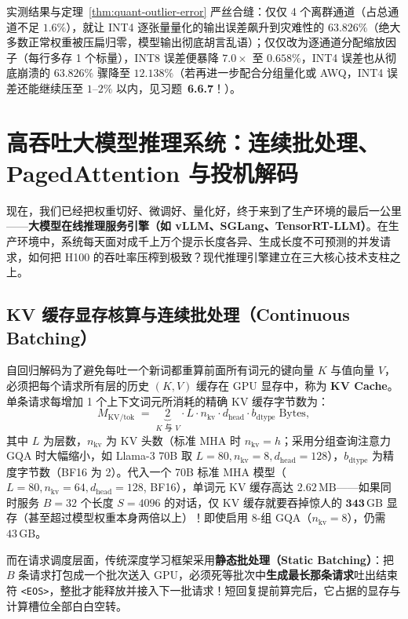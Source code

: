 实测结果与定理~\ref{thm:quant-outlier-error} 严丝合缝：仅仅 4 个离群通道（占总通道不足 $1.6\%$），就让 INT4 逐张量量化的输出误差飙升到灾难性的 $\mathbf{63.826\%}$（绝大多数正常权重被压扁归零，模型输出彻底胡言乱语）；仅仅改为逐通道分配缩放因子（每行多存 1 个标量），INT8 误差便暴降 $7.0\times$ 至 $\mathbf{0.658\%}$，INT4 误差也从彻底崩溃的 $63.826\%$ 骤降至 $\mathbf{12.138\%}$（若再进一步配合分组量化或 AWQ，INT4 误差还能继续压至 $1\text{--}2\%$ 以内，见习题~\textbf{6.6.7}！）。

\section{高吞吐大模型推理系统：连续批处理、PagedAttention 与投机解码}
\label{sec:llm-serving}

现在，我们已经把权重切好、微调好、量化好，终于来到了生产环境的最后一公里——\textbf{大模型在线推理服务引擎（如 vLLM、SGLang、TensorRT-LLM）}。在生产环境中，系统每天面对成千上万个提示长度各异、生成长度不可预测的并发请求，如何把 H100 的吞吐率压榨到极致？现代推理引擎建立在三大核心技术支柱之上。

\subsection{KV 缓存显存核算与连续批处理（Continuous Batching）}

自回归解码为了避免每吐一个新词都重算前面所有词元的键向量 $K$ 与值向量 $V$，必须把每个请求所有层的历史 $(K, V)$ 缓存在 GPU 显存中，称为 \textbf{KV Cache}。单条请求每增加 1 个上下文词元所消耗的精确 KV 缓存字节数为：
\begin{equation}
  M_{\mathrm{KV/tok}} \;=\; \underbrace{2}_{K\text{ 与 }V} \cdot L \cdot n_{\mathrm{kv}} \cdot d_{\mathrm{head}} \cdot b_{\mathrm{dtype}}\;\text{Bytes},
  \label{eq:kv-cache-formula}
\end{equation}
其中 $L$ 为层数，$n_{\mathrm{kv}}$ 为 KV 头数（标准 MHA 时 $n_{\mathrm{kv}} = h$；采用分组查询注意力 GQA 时大幅缩小，如 Llama-3 70B 取 $L = 80, n_{\mathrm{kv}} = 8, d_{\mathrm{head}} = 128$），$b_{\mathrm{dtype}}$ 为精度字节数（BF16 为 2）。代入一个 70B 标准 MHA 模型（$L=80, n_{\mathrm{kv}}=64, d_{\mathrm{head}}=128$, BF16），单词元 KV 缓存高达 $2.62\,\mathrm{MB}$——如果同时服务 $B = 32$ 个长度 $S = 4096$ 的对话，仅 KV 缓存就要吞掉惊人的 $\mathbf{343\,\mathrm{GB}}$ 显存（甚至超过模型权重本身两倍以上）！即使启用 8-组 GQA（$n_{\mathrm{kv}} = 8$），仍需 $43\,\mathrm{GB}$。

而在请求调度层面，传统深度学习框架采用\textbf{静态批处理（Static Batching）}：把 $B$ 条请求打包成一个批次送入 GPU，必须死等批次中\textbf{生成最长那条请求}吐出结束符 \texttt{<EOS>}，整批才能释放并接入下一批请求！短回复提前算完后，它占据的显存与计算槽位全部白白空转。

